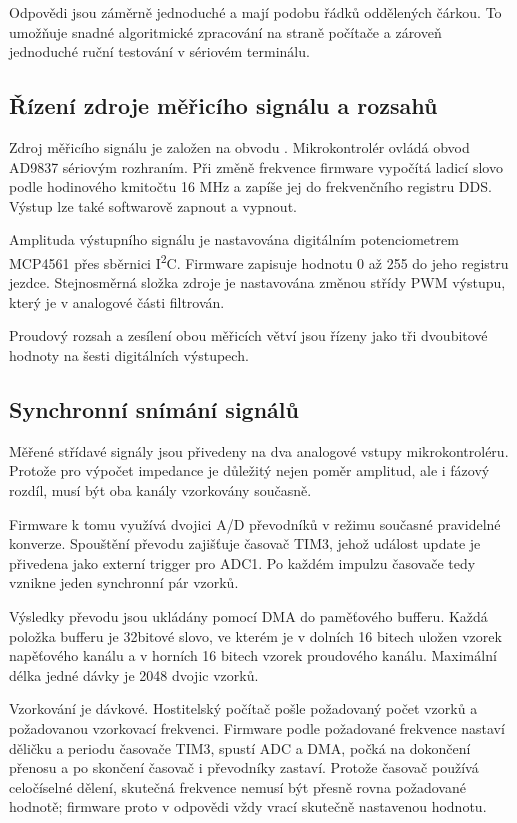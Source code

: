 Odpovědi jsou záměrně jednoduché a mají podobu řádků oddělených čárkou. 
To umožňuje snadné algoritmické zpracování na straně počítače a zároveň jednoduché ruční testování v sériovém terminálu.

\subsection{Řízení zdroje měřicího signálu a rozsahů}

Zdroj měřicího signálu je založen na obvodu . 
Mikrokontrolér ovládá obvod AD9837 sériovým rozhraním. 
Při změně frekvence firmware vypočítá ladicí slovo podle hodinového kmitočtu 16 MHz 
a zapíše jej do frekvenčního registru DDS. 
Výstup lze také softwarově zapnout a vypnout.

Amplituda výstupního signálu je nastavována digitálním potenciometrem MCP4561 přes sběrnici I\textsuperscript{2}C. 
Firmware zapisuje hodnotu 0 až 255 do jeho registru jezdce. 
Stejnosměrná složka zdroje je nastavována změnou střídy PWM výstupu, který je v analogové části filtrován.

Proudový rozsah a zesílení obou měřicích větví jsou řízeny jako tři dvoubitové hodnoty na šesti digitálních výstupech. 

\subsection{Synchronní snímání signálů}

Měřené střídavé signály jsou přivedeny na dva analogové vstupy mikrokontroléru. 
Protože pro výpočet impedance je důležitý nejen poměr amplitud, ale i fázový rozdíl,
musí být oba kanály vzorkovány současně.

Firmware k tomu využívá dvojici \acs{A/D} převodníků v režimu současné pravidelné konverze. 
Spouštění převodu zajišťuje časovač TIM3, jehož událost update je přivedena jako externí trigger pro ADC1. 
Po každém impulzu časovače tedy vznikne jeden synchronní pár vzorků.

Výsledky převodu jsou ukládány pomocí \acs{DMA} do paměťového bufferu. 
Každá položka bufferu je 32bitové slovo, ve kterém je v dolních 16 bitech uložen vzorek napěťového kanálu a v horních 16 bitech vzorek proudového kanálu. 
Maximální délka jedné dávky je 2048 dvojic vzorků.

Vzorkování je dávkové. 
Hostitelský počítač pošle požadovaný počet vzorků a požadovanou vzorkovací frekvenci. 
Firmware podle požadované frekvence nastaví děličku a periodu časovače TIM3, spustí ADC a DMA, 
počká na dokončení přenosu a po skončení časovač i převodníky zastaví. 
Protože časovač používá celočíselné dělení, skutečná frekvence nemusí být přesně rovna požadované hodnotě; 
firmware proto v odpovědi vždy vrací skutečně nastavenou hodnotu.


